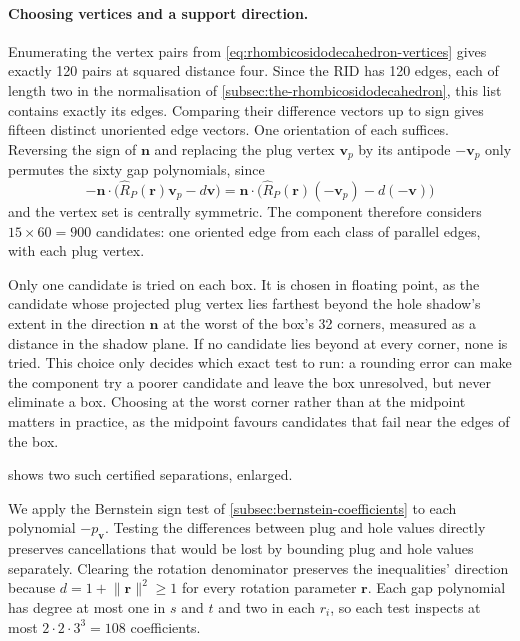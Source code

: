 \paragraph{Choosing vertices and a support direction.}
Enumerating the vertex pairs from \cref{eq:rhombicosidodecahedron-vertices}
gives exactly 120 pairs at squared distance four. Since the RID has 120
edges, each of length two in the normalisation of
\cref{subsec:the-rhombicosidodecahedron}, this list contains exactly its
edges. Comparing their difference vectors up to sign gives fifteen distinct
unoriented edge vectors. One orientation of each suffices. Reversing the
sign of $\mathbf n$ and replacing the plug vertex $\mathbf v_p$ by its
antipode $-\mathbf v_p$ only permutes the sixty gap polynomials, since
\[
  -\mathbf n\cdot\bigl(\widehat R_P(\mathbf r)\mathbf v_p-d\mathbf v\bigr)
   =\mathbf n\cdot\bigl(\widehat R_P(\mathbf r)(-\mathbf v_p)-d(-\mathbf v)\bigr)
\]
and the vertex set is centrally symmetric. The component therefore
considers $15\times60=900$ candidates: one oriented edge from each class
of parallel edges, with each plug vertex.

Only one candidate is tried on each box. It is chosen in floating point,
as the candidate whose projected plug vertex lies farthest beyond the hole
shadow's extent in the direction $\mathbf n$ at the worst of the box's 32
corners, measured as a distance in the shadow plane. If no candidate lies
beyond at every corner, none is tried. This choice only decides which
exact test to run: a rounding error can make the component try a poorer
candidate and leave the box unresolved, but never eliminate a box. Choosing
at the worst corner rather than at the midpoint matters in practice, as
the midpoint favours candidates that fail near the edges of the box.

 shows two such certified separations, enlarged.

We apply the Bernstein sign test of \cref{subsec:bernstein-coefficients}
to each polynomial $-p_{\mathbf v}$. Testing the differences between plug
and hole values directly preserves cancellations that would be lost by
bounding plug and hole values separately.
Clearing the rotation denominator preserves the inequalities' direction
because $d=1+\lVert\mathbf r\rVert^2\ge1$ for every rotation parameter $\mathbf r$.
Each gap polynomial has degree at most one in $s$ and $t$ and two in each
$r_i$, so each test inspects at most $2\cdot2\cdot3^3=108$ coefficients.

